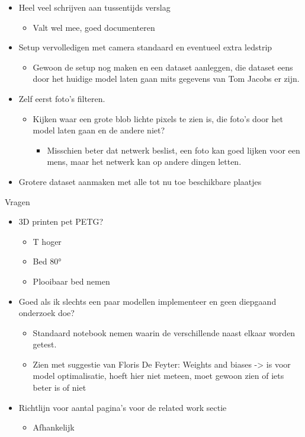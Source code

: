 \documentclass{scrartcl}
\begin{document}
	\begin{itemize}
	\item Heel veel schrijven aan tussentijds verslag
		\begin{itemize}
		\item Valt wel mee, goed documenteren
		\end{itemize}
	\item Setup vervolledigen met camera standaard en eventueel extra ledstrip
		\begin{itemize}
		\item Gewoon de setup nog maken en een dataset aanleggen, die dataset eens door het huidige model laten gaan mits gegevens van Tom Jacobs er zijn.
		\end{itemize}
	\item Zelf eerst foto’s filteren.
		\begin{itemize}
		\item Kijken waar een grote blob lichte pixels te zien is, die foto’s door het model laten gaan en de andere niet?
			\begin{itemize}
			\item Misschien beter dat netwerk beslist, een foto kan goed lijken voor een mens, maar het netwerk kan op andere dingen letten.
			\end{itemize}
		\end{itemize}
	\item Grotere dataset aanmaken met alle tot nu toe beschikbare plaatjes
	\end{itemize}




Vragen

	\begin{itemize}
	\item 3D printen pet PETG? 
		\begin{itemize}
		\item T hoger
		\item Bed 80°
		\item Plooibaar bed nemen
		\end{itemize}
	\item Goed als ik slechts een paar modellen implementeer en geen diepgaand onderzoek doe?
		\begin{itemize}
		\item Standaard notebook nemen waarin de verschillende naast elkaar worden getest. 
		\item Zien met suggestie van Floris De Feyter: Weights and biases -\textgreater{} is voor model optimalisatie, hoeft hier niet meteen, moet gewoon zien of iets beter is of niet
		\end{itemize}
	\item Richtlijn voor aantal pagina’s voor de related work sectie
		\begin{itemize}
		\item Afhankelijk
		\end{itemize}
	\end{itemize}
\end{document}
